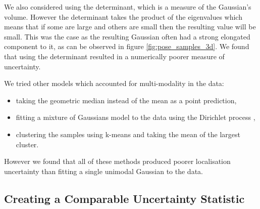 We also considered using the determinant, which is a measure of the Gaussian's volume. However the determinant takes the product of the eigenvalues which means that if some are large and others are small then the resulting value will be small. This was  the case as the resulting Gaussian often had a strong elongated component to it, as can be observed in figure \ref{fig:pose_samples_3d}. We found that using the determinant resulted in a numerically poorer measure of uncertainty.

We tried other models which accounted for multi-modality in the data:
\begin{itemize}
\item taking the geometric median instead of the mean as a point prediction,
\item fitting a mixture of Gaussians model to the data using the Dirichlet process \citep{blei2006variational},
\item clustering the samples using k-means and taking the mean of the largest cluster.
\end{itemize}
However we found that all of these methods produced poorer localisation uncertainty than fitting a single unimodal Gaussian to the data.

\subsection{Creating a Comparable Uncertainty Statistic}
\label{ch:uncertainty_dist}

